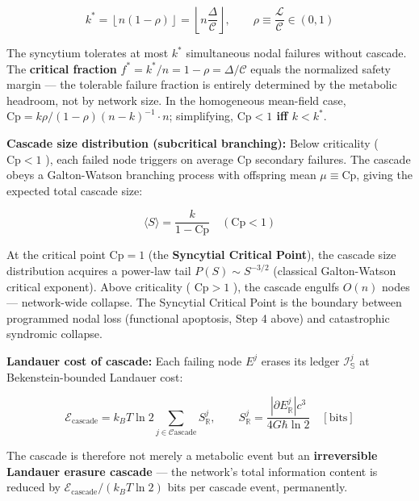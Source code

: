 \documentclass[11pt,a4paper]{article}
\theoremstyle{definition}
\theoremstyle{remark}
\begin{document}
\begin{equation}
\boxed{k^* = \left\lfloor n\left(1 - \rho\right) \right\rfloor = \left\lfloor n\frac{\Delta}{\mathcal{C}} \right\rfloor, \qquad \rho \equiv \frac{\mathcal{L}}{\mathcal{C}} \in (0,1)}
\end{equation}


The syncytium tolerates at most $k^*$ simultaneous nodal failures without cascade. The \textbf{critical fraction} $f^* = k^*/n = 1-\rho = \Delta/\mathcal{C}$ equals the normalized safety margin — the tolerable failure fraction is entirely determined by the metabolic headroom, not by network size. In the homogeneous mean-field case, $\mathrm{Cp} = k\rho/(1-\rho)(n-k)^{-1} \cdot n$; simplifying, \textbf{$\mathrm{Cp} < 1$ iff $k < k^*$}.

\textbf{Cascade size distribution (subcritical branching):} Below criticality ( $\mathrm{Cp} < 1$ ), each failed node triggers on average $\mathrm{Cp}$ secondary failures. The cascade obeys a Galton-Watson branching process with offspring mean $\mu \equiv \mathrm{Cp}$, giving the expected total cascade size:


\begin{equation}
\langle S \rangle = \frac{k}{1 - \mathrm{Cp}} \quad (\mathrm{Cp} < 1)
\end{equation}


At the critical point $\mathrm{Cp} = 1$ (the \textbf{Syncytial Critical Point}), the cascade size distribution acquires a power-law tail $P(S) \sim S^{-3/2}$ (classical Galton-Watson critical exponent). Above criticality ( $\mathrm{Cp} > 1$ ), the cascade engulfs $O(n)$ nodes — network-wide collapse. The Syncytial Critical Point is the boundary between programmed nodal loss (functional apoptosis, Step 4 above) and catastrophic syndromic collapse.

\textbf{Landauer cost of cascade:} Each failing node $E^j$ erases its ledger $\mathcal{I}^j_{\mathbb{S}}$ at Bekenstein-bounded Landauer cost:


\begin{equation}
\mathcal{E}_{\text{cascade}} = k_B T \ln 2 \sum_{j \in \mathcal{C}\text{ascade}} S^j_{\mathbb{R}}, \qquad S^j_{\mathbb{R}} = \frac{|\partial E^j_{\mathbb{R}}| c^3}{4G\hbar \ln 2} \quad [\text{bits}]
\end{equation}


The cascade is therefore not merely a metabolic event but an \textbf{irreversible Landauer erasure cascade} — the network's total information content is reduced by $\mathcal{E}_{\text{cascade}}/(k_BT\ln2)$ bits per cascade event, permanently.
\end{document}

